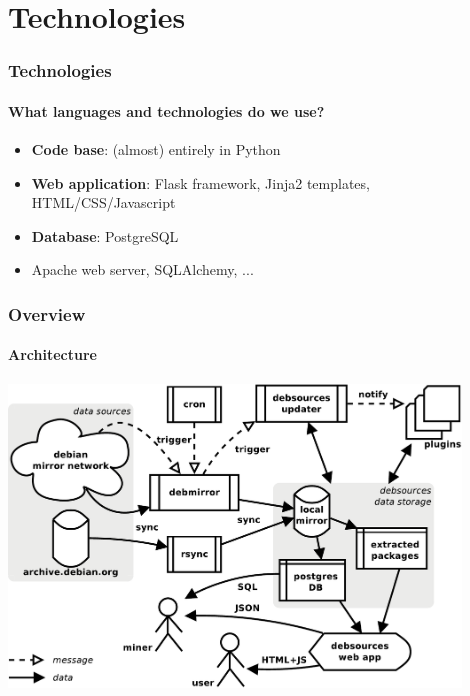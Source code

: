 \documentclass{beamer}
\begin{document}
\section{Technologies}

\begin{frame}
  \frametitle{Technologies}
  \framesubtitle{What languages and technologies do we use?}
  \begin{itemize}
  \item \textbf{Code base}: (almost) entirely in Python
    \pause
  \item \textbf{Web application}: Flask framework, Jinja2 templates,
    HTML/CSS/Javascript
    \pause
  \item \textbf{Database}: PostgreSQL
    \pause
  \item Apache web server, SQLAlchemy, ...
  \end{itemize}
\end{frame}

\begin{frame}
  \frametitle{Overview}
  \framesubtitle{Architecture}
  \begin{center}
    \includegraphics[width=0.9\textwidth]{img/architecture}
  \end{center}
\end{frame}
\end{document}
